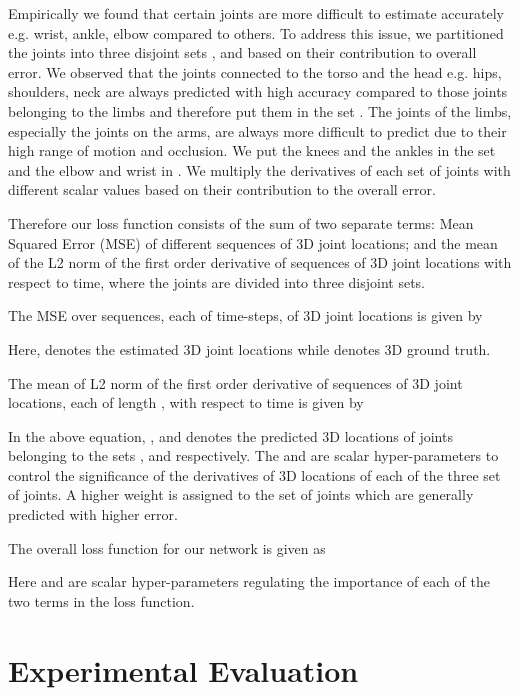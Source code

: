 \documentclass[runningheads]{llncs}
\begin{document}
Empirically we found that certain joints are  more difficult to estimate accurately e.g. wrist, ankle, elbow compared to others. To address this issue, we partitioned the joints into three disjoint sets ,  and  based on their contribution to overall error. We observed that the joints connected to the torso and the head e.g. hips, shoulders, neck are always predicted with high accuracy compared to those joints belonging to the limbs and therefore put them in the set . The joints of the limbs, especially the joints on the arms, are always more difficult to predict due to their high range of motion and occlusion. We put the knees and the ankles in the set   and the elbow and wrist in . We multiply the derivatives of each set of joints with different scalar values based on their contribution to the overall error.

Therefore our loss function consists of the sum of two separate terms: Mean Squared Error (MSE) of  different sequences of 3D joint locations; and the mean of the L2 norm of the first order derivative of  sequences of 3D joint locations with respect to time, where the joints are divided into three disjoint sets.

The MSE over  sequences, each of  time-steps, of 3D joint locations is given by 

 Here,  denotes the estimated 3D joint locations while  denotes 3D ground truth. 

The mean of L2 norm of the first order derivative of  sequences of 3D joint locations, each of length , with respect to time is given by

 In the above equation, ,  and  denotes the predicted 3D locations of joints belonging to the sets ,  and  respectively. The  and  are scalar hyper-parameters to control the significance of the derivatives of 3D locations of each of the three set of joints. A higher weight is assigned to the set of joints which are generally predicted with higher error.  

The overall loss function for our network is given as

Here  and  are scalar hyper-parameters regulating the importance of each of the two terms in the loss function. 

\section{Experimental Evaluation}
\end{document}
